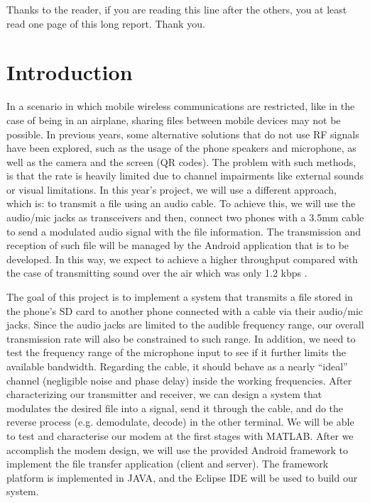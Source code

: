 \documentclass[12pt,a4paper,openright]{report}
\renewenvironment{abstract}
  {\small\quotation
  {\bfseries\noindent{\large\abstractname}\par\nobreak\smallskip}}
  {\endquotation}
\begin{document}
\renewcommand{\abstractname}{Acknowledgements}
\begin{abstract}
 Thanks to the reader, if you are reading this line after the others, you at least read one page of this long report. Thank you.
\end{abstract}

\clearpage





\chapter{Introduction}

In a scenario in which mobile wireless communications are restricted, like in the case of being in an airplane, sharing files between mobile devices may not be possible. In previous years, some alternative solutions that do not use RF signals have been explored, such as the usage of the phone speakers and microphone, as well as the camera and the screen (QR codes). The problem with such methods, is that the rate is heavily limited due to channel impairments like external sounds or visual limitations.
In this year’s project, we will use a different approach, which is: to transmit a file using an audio cable. To achieve this, we will use the audio/mic jacks as transceivers and then, connect two phones with a 3.5mm cable to send a modulated audio signal with the file information. The transmission and reception of such file will be managed by the Android application that is to be developed. In this way, we expect to achieve a higher throughput compared with the case of transmitting sound over the air which was only 1.2 kbps \cite{report2012}.

The goal of this project is to implement a system that transmits a file stored in the phone’s SD card to another phone connected with a cable via their audio/mic jacks. Since the audio jacks are limited to the audible frequency range, our overall transmission rate will also be constrained to such range. In addition, we need to test the frequency range of the microphone input to see if it further limits the available bandwidth. Regarding the cable, it should behave as a nearly “ideal” channel (negligible noise and phase delay) inside the working frequencies.
After characterizing our transmitter and receiver, we can design a system that modulates the desired file into a signal, send it through the cable, and do the reverse process (e.g. demodulate, decode) in the other terminal. We will be able to test and characterise our modem at the first stages with MATLAB. 
After we accomplish the modem design, we will use the provided Android framework to implement the file transfer application (client and server). The framework platform is implemented in JAVA, and the Eclipse IDE will be used to build our system. 
\end{document}
